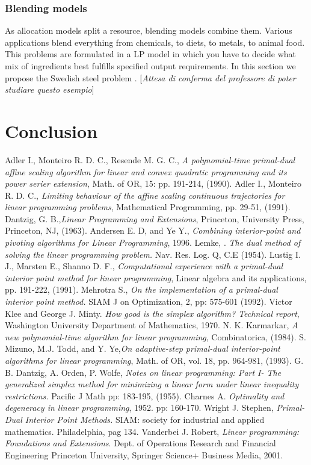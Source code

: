 \documentclass[a4paper,10 pt,titlepage,twoside]{book}
\theoremstyle{plain}
\theoremstyle{definition}
\theoremstyle{remark}
\begin{document}
\subsection*{Blending models}
As allocation models split a resource, blending models combine them. Various applications blend everything from chemicals, to diets, to metals, to animal food. This problems are formulated in a LP model in which you have to decide what mix of ingredients best fulfills specified output requirements. In this section we propose the Swedish steel problem \cite{SP}. [\textit{Attesa di conferma del professore di poter studiare questo esempio}] 
\chapter{Conclusion}

\begin{thebibliography}{9}
	 Adler I., Monteiro R. D. C., Resende M. G. C., \emph{A polynomial-time primal-dual affine scaling algorithm for linear and convex quadratic programming and its power serier extension}, Math. of OR, 15: pp. 191-214, (1990).
	 Adler I., Monteiro R. D. C., \emph{Limiting behaviour of the affine scaling continuous trajectories for linear programming problems}, Mathematical Programming, pp. 29-51, (1991).
	Dantzig, G. B.,\emph{\;Linear Programming and Extensions}, Princeton, University Press, Princeton, NJ, (1963).
	 Andersen E. D, and Ye Y.,  \textit{Combining interior-point and pivoting algorithms for Linear Programming}, 1996.
	 Lemke, . \textit{ The dual method of solving the linear programming problem.} Nav. Res. Log. Q, C.E (1954).
		 Lustig I. J., Marsten E., Shanno D. F., \emph{ Computational experience with a primal-dual interior point method for linear programming}, Linear algebra and its applications, pp. 191-222, (1991).
	 Mehrotra S., \emph{ On the implementation of a primal-dual interior point method. } SIAM J on Optimization, 2, pp: 575-601 (1992).
	Victor Klee and George J. Minty.\emph{ How good is the simplex algorithm? Technical report}, Washington University Department of Mathematics, 1970.
	 N. K. Karmarkar,\emph{ A new polynomial-time algorithm for linear programming}, Combinatorica, (1984).
	 S. Mizuno, M.J. Todd, and Y. Ye,\emph{\;On adaptive-step primal-dual interior-point algorithms for linear programming}, Math. of OR, vol. 18, pp. 964-981, (1993). 
	 G. B. Dantzig, A. Orden, P. Wolfe, \emph{ Notes on linear programming: Part I- The generalized simplex method for
	minimizing a linear form under linear inequality restrictions.} Pacific J Math pp: 183-195, (1955). 
	  Charnes A. \emph{ Optimality and degeneracy in linear programming}, 1952. pp: 160-170. 
	 Wright J. Stephen, \emph{\;Primal-Dual Interior Point Methods.} SIAM: society for industrial and applied mathematics. Philadelphia, pag 134.
	 Vanderbei J. Robert, \emph{\;Linear programming:
		Foundations and Extensions}. Dept. of Operations Research and Financial Engineering
	Princeton University, Springer Science+ Business Media, 2001.




\end{thebibliography}
\end{document}
